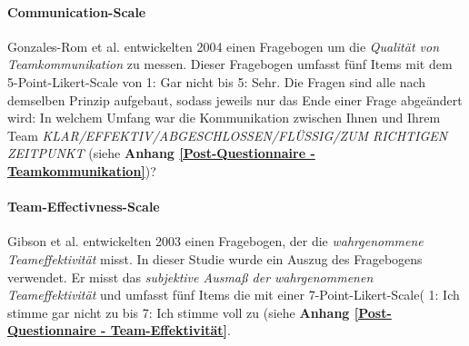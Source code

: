 \documentclass[a4paper,11pt]{article}%
\renewcommand{\\}{\vspace*{0.5\baselineskip} \newline}
\begin{document}

		\paragraph{Communication-Scale}
Gonzales-Rom et al. \citep[p.1049]{gonzalez2014climate} entwickelten 2004 einen Fragebogen um die  \textit{Qualität von Teamkommunikation} zu messen. Dieser Fragebogen umfasst fünf Items mit dem 5-Point-Likert-Scale von 1: \dq{}Gar nicht\dq{} bis 5: \dq{}Sehr\dq{}. Die Fragen sind alle nach demselben Prinzip aufgebaut, sodass jeweils nur das Ende einer Frage abgeändert wird: \dq{}In welchem Umfang war die Kommunikation zwischen Ihnen und Ihrem Team \textit{\dq{} KLAR/EFFEKTIV/ABGESCHLOSSEN/FLÜSSIG/ZUM RICHTIGEN ZEITPUNKT\dq{}} (siehe \textbf{Anhang \ref{Post-Questionnaire - Teamkommunikation}})?

		\paragraph{Team-Effectivness-Scale}
Gibson et al. \citep[p.469]{gibson2003team} entwickelten 2003 einen Fragebogen, der die \textit{wahrgenommene Teameffektivität} misst. In dieser Studie wurde ein Auszug des Fragebogens verwendet. Er misst das \textit{subjektive Ausmaß der wahrgenommenen Teameffektivität} und umfasst fünf Items die mit einer 7-Point-Likert-Scale( 1: \dq{}Ich stimme gar nicht zu \dq{} bis 7: \dq{}Ich stimme voll zu \dq{} (siehe \textbf{Anhang \ref{Post-Questionnaire - Team-Effektivität}}.
\end{document}
